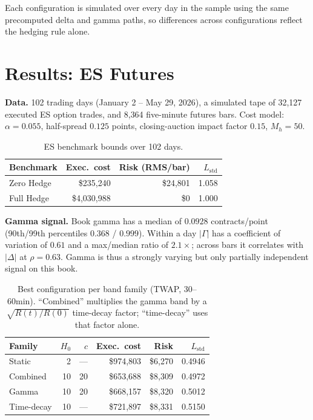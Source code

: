 \documentclass{article}
\begin{document}
Each configuration is simulated over every day in the sample using the same precomputed
delta and gamma paths, so differences across configurations reflect the hedging rule
alone.

\section{Results: ES Futures}

\textbf{Data.} 102 trading days (January 2 -- May 29, 2026), a simulated tape of
32{,}127 executed ES option trades, and 8{,}364 five-minute futures bars. Cost model:
$\alpha = 0.055$, half-spread $0.125$ points, closing-auction impact factor $0.15$,
$M_h = 50$.

\begin{table}[htbp]
\centering
\small
\begin{tabular}{lrrr}
\toprule
\textbf{Benchmark} & \textbf{Exec.\ cost} & \textbf{Risk (RMS/bar)} & $L_{\text{std}}$ \\
\midrule
Zero Hedge & \$235{,}240   & \$24{,}801 & 1.058 \\
Full Hedge & \$4{,}030{,}988 & \$0      & 1.000 \\
\bottomrule
\end{tabular}
\caption{ES benchmark bounds over 102 days.}
\end{table}

\textbf{Gamma signal.} Book gamma has a median of $0.0928$ contracts/point (90th/99th
percentiles $0.368$ / $0.999$). Within a day $\lvert\Gamma\rvert$ has a coefficient of
variation of $0.61$ and a max/median ratio of $2.1\times$; across bars it correlates with
$\lvert\Delta\rvert$ at $\rho = 0.63$. Gamma is thus a strongly varying but only
partially independent signal on this book.

\begin{table}[htbp]
\centering
\small
\begin{tabular}{lrrrrr}
\toprule
\textbf{Family} & $H_0$ & $c$ & \textbf{Exec.\ cost} & \textbf{Risk} & $L_{\text{std}}$ \\
\midrule
Static      & 2  & ---  & \$974{,}803 & \$6{,}270 & 0.4946 \\
Combined    & 10 & 20   & \$653{,}688 & \$8{,}309 & 0.4972 \\
Gamma       & 10 & 20   & \$668{,}157 & \$8{,}320 & 0.5012 \\
Time-decay  & 10 & ---  & \$721{,}897 & \$8{,}331 & 0.5150 \\
\bottomrule
\end{tabular}
\caption{Best configuration per band family (TWAP, 30--60min). ``Combined'' multiplies the
gamma band by a $\sqrt{R(t)/R(0)}$ time-decay factor; ``time-decay'' uses that factor
alone.}
\end{table}
\end{document}
